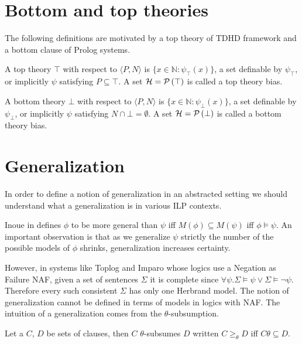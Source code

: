 \section{Bottom and top theories}
The following definitions are motivated by a top theory of TDHD framework and a bottom clause of Prolog systems.
\begin{defn}
A top theory $\top$ with respect to $\langle P, N \rangle$ is
$\{x \in \mathbb{N} : \psi_\top(x)\}$,
a set definable by $\psi_\top$, or implicitly $\psi$ satisfying
$P \subseteq \top$.
A set $\mathcal{H}=\mathcal{P} \left({ \top }\right)$ is called a top theory bias.
\end{defn}

\begin{defn}
A bottom theory $\bot$ with respect to $\langle P, N \rangle$ is
$\{x \in \mathbb{N} : \psi_\bot(x)\}$,
a set definable by $\psi_\bot$, or implicitly $\psi$ satisfying
$N \cap \bot = \emptyset$.
A set $\mathcal{H}=\mathcal{P} \left({ \bot }\right)$ is called a bottom theory bias.
\end{defn}

\section{Generalization}
In order to define a notion of generalization in an abstracted setting we should understand what a generalization is in various ILP contexts.

Inoue in \cite{inoue2012} defines $\phi$ to be more general than $\psi$ iff
$M(\phi) \subseteq M(\psi)$ iff $\phi \models \psi$. An important observation is that as we generalize $\psi$ strictly the number of the possible models of $\phi$ shrinks, generalization increases certainty.

However, in systems like Toplog and Imparo whose logics use a Negation as Failure NAF, given a set of sentences $\Sigma$ it is complete since
$\forall \psi. \Sigma \models \psi \vee \Sigma \models \neg\psi$. Therefore every such consistent $\Sigma$ has only one Herbrand model. The notion of generalization cannot be defined in terms of models in logics with NAF. The intuition of a generalization comes from the $\theta$-subsumption.

\begin{defn}
Let a $C$, $D$ be sets of clauses, then $C$ $\theta$-subsumes $D$  written
$C \ge_\theta D$ iff $C \theta \subseteq D$.
\end{defn}

